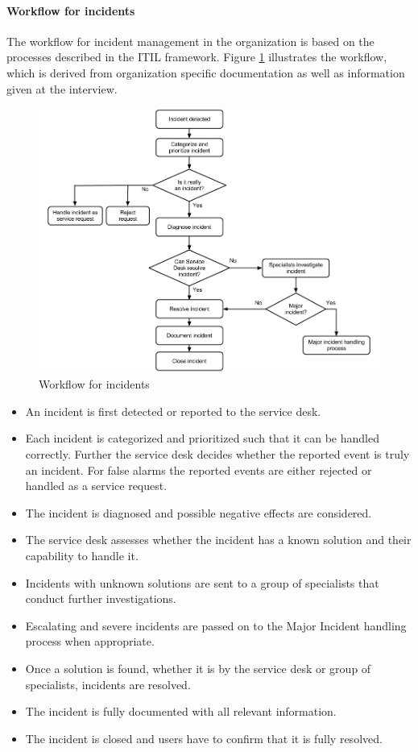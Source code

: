 \paragraph{Workflow for incidents}
The workflow for incident management in the organization is based on the processes described in the ITIL framework. Figure \ref{fig:workflowcaseC} illustrates the workflow, which is derived from organization specific documentation as well as information given at the interview. 

\begin{figure}[H]
\hspace{-1.1cm}\includegraphics[scale=0.49]{workflowcaseC.png}
\caption[Workflow for incidents, Case B]{Workflow for incidents}
\label{fig:workflowcaseC}
\end{figure}

\begin{itemize}
\item An incident is first detected or reported to the service desk.
\item Each incident is categorized and prioritized such that it can be handled correctly. Further the service desk decides whether the reported event is truly an incident. For false alarms the reported events are either rejected or handled as a service request.
\item The incident is diagnosed and possible negative effects are considered.
\item The service desk assesses whether the incident has a known solution and their capability to handle it.
\item Incidents with unknown solutions are sent to a group of specialists that conduct further investigations.
\item Escalating and severe incidents are passed on to the Major Incident handling process when appropriate. 
\item Once a solution is found, whether it is by the service desk or group of specialists, incidents are resolved.
\item The incident is fully documented with all relevant information.
\item The incident is closed and users have to confirm that it is fully resolved. 
\end{itemize}

